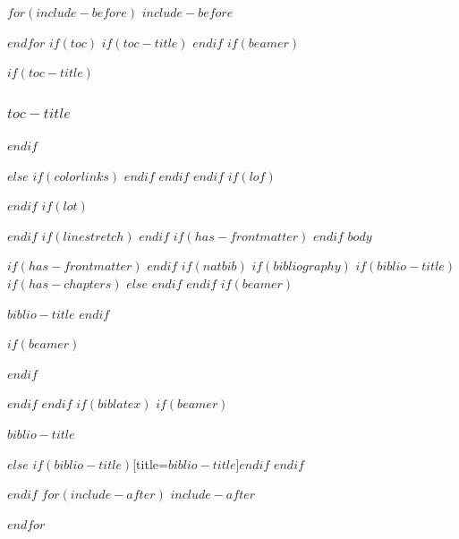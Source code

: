 \documentclass[
$if(fontsize)$
  $fontsize$,
$endif$
$if(papersize)$
  $papersize$paper,
$endif$
$if(beamer)$
  ignorenonframetext,
$if(handout)$
  handout,
$endif$
$if(aspectratio)$
  aspectratio=$aspectratio$,
$endif$
$endif$
$for(classoption)$
  $classoption$$sep$,
$endfor$
]{$documentclass$}
\newif\ifbibliography
\renewcommand{\contentsname}{СОДЕРЖАНИЕ}
\begin{document}
$for(include-before)$
$include-before$

$endfor$
$if(toc)$
$if(toc-title)$
\renewcommand*\contentsname{$toc-title$}
$endif$
$if(beamer)$
\begin{frame}[allowframebreaks]
$if(toc-title)$
  \frametitle{$toc-title$}
$endif$
  \tableofcontents[hideallsubsections]
\end{frame}
$else$
{
$if(colorlinks)$
\hypersetup{linkcolor=$if(toccolor)$$toccolor$$else$$endif$}
$endif$
\setcounter{tocdepth}{$toc-depth$}
\tableofcontents
}
$endif$
$endif$
\clearpage
$if(lof)$
\listoffigures
$endif$
$if(lot)$
\listoftables
$endif$
$if(linestretch)$
$endif$
$if(has-frontmatter)$
\mainmatter
$endif$
$body$

$if(has-frontmatter)$
\backmatter
$endif$
$if(natbib)$
$if(bibliography)$
$if(biblio-title)$
$if(has-chapters)$
\renewcommand\bibname{$biblio-title$}
$else$
\renewcommand\refname{$biblio-title$}
$endif$
$endif$
$if(beamer)$
\begin{frame}[allowframebreaks]{$biblio-title$}
  \bibliographytrue
$endif$
  
$if(beamer)$
\end{frame}
$endif$

$endif$
$endif$
$if(biblatex)$
$if(beamer)$
\begin{frame}[allowframebreaks]{$biblio-title$}
  \bibliographytrue
  \printbibliography[heading=none]
\end{frame}
$else$
\printbibliography$if(biblio-title)$[title=$biblio-title$]$endif$
$endif$

$endif$
$for(include-after)$
$include-after$

$endfor$
\end{document}
